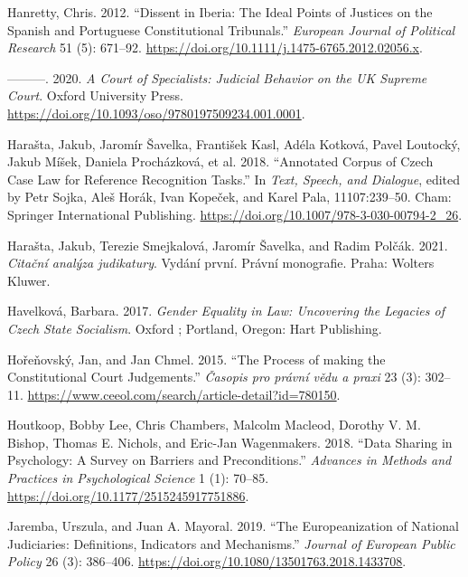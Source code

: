 \documentclass[
  11pt,
]{article}
\newlength{\cslhangindent}
\newenvironment{CSLReferences}[2] %
 {\begin{list}{}{%
  \setlength{\itemindent}{0pt}
  \setlength{\leftmargin}{0pt}
  \setlength{\parsep}{0pt}
  \ifodd #1
   \setlength{\leftmargin}{\cslhangindent}
   \setlength{\itemindent}{-1\cslhangindent}
  \fi
  \setlength{\itemsep}{#2\baselineskip}}}
 {\end{list}}
\begin{document}
\begin{CSLReferences}{1}{0}
Hanretty, Chris. 2012. {``Dissent in {Iberia}: {The} Ideal Points of Justices on the {Spanish} and {Portuguese Constitutional Tribunals}.''} \emph{European Journal of Political Research} 51 (5): 671--92. \url{https://doi.org/10.1111/j.1475-6765.2012.02056.x}.

---------. 2020. \emph{A {Court} of {Specialists}: {Judicial Behavior} on the {UK Supreme Court}}. Oxford University Press. \url{https://doi.org/10.1093/oso/9780197509234.001.0001}.

Harašta, Jakub, Jaromír Šavelka, František Kasl, Adéla Kotková, Pavel Loutocký, Jakub Míšek, Daniela Procházková, et al. 2018. {``Annotated {Corpus} of {Czech Case Law} for {Reference Recognition Tasks}.''} In \emph{Text, {Speech}, and {Dialogue}}, edited by Petr Sojka, Aleš Horák, Ivan Kopeček, and Karel Pala, 11107:239--50. Cham: Springer International Publishing. \url{https://doi.org/10.1007/978-3-030-00794-2_26}.

Harašta, Jakub, Terezie Smejkalová, Jaromír Šavelka, and Radim Polčák. 2021. \emph{Citační analýza judikatury}. Vydání první. Právní monografie. Praha: Wolters Kluwer.

Havelková, Barbara. 2017. \emph{Gender Equality in Law: Uncovering the Legacies of {Czech State} Socialism}. Oxford ; Portland, Oregon: Hart Publishing.

Hořeňovský, Jan, and Jan Chmel. 2015. {``The Process of making the Constitutional Court Judgements.''} \emph{Časopis pro právní vědu a praxi} 23 (3): 302--11. \url{https://www.ceeol.com/search/article-detail?id=780150}.

Houtkoop, Bobby Lee, Chris Chambers, Malcolm Macleod, Dorothy V. M. Bishop, Thomas E. Nichols, and Eric-Jan Wagenmakers. 2018. {``Data {Sharing} in {Psychology}: {A Survey} on {Barriers} and {Preconditions}.''} \emph{Advances in Methods and Practices in Psychological Science} 1 (1): 70--85. \url{https://doi.org/10.1177/2515245917751886}.

Jaremba, Urszula, and Juan A. Mayoral. 2019. {``The {Europeanization} of National Judiciaries: Definitions, Indicators and Mechanisms.''} \emph{Journal of European Public Policy} 26 (3): 386--406. \url{https://doi.org/10.1080/13501763.2018.1433708}.


\end{CSLReferences}
\end{document}
